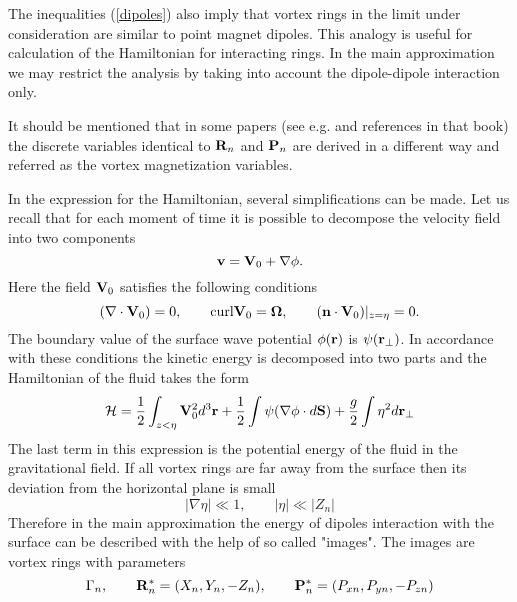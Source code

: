 The inequalities (\ref{dipoles}) also imply that vortex rings in the limit under 
consideration are similar to  point magnet dipoles. 
This analogy is useful for calculation of the Hamiltonian for interacting 
rings. In the main approximation we may restrict the analysis by 
taking into account the dipole-dipole interaction only.

It should be mentioned that in some papers
(see e.g. \cite{Chorin} and references in that book) the discrete variables
identical to ${\bf R}_{n}$ and ${\bf P}_n$ are derived in a different way and 
referred as the vortex magnetization variables. 

In the expression for the Hamiltonian, several simplifications can be made.
Let us recall that for each moment of time it is possible to decompose 
the velocity field into two components
\begin{equation}
{\bf v}={\bf V}_0+\nabla\phi.
\end{equation}
Here the field ${\bf V}_0$ satisfies the following conditions
$$
(\nabla\cdot{\bf V}_0)=0,\qquad \mbox{curl}{\bf V}_0={\bf \Omega},\qquad
({\bf n}\cdot{\bf V}_0)|_{z=\eta}=0.
$$
The boundary value of the surface wave potential $\phi({\bf r})$ is 
$\psi({\bf r}_\bot)$. In accordance with these conditions 
the kinetic energy is decomposed into two parts and the Hamiltonian
of the fluid takes the form
\begin{equation}
{\cal H}=\frac{1}{2}\int_{z<\eta}{\bf V}_0^2d^3{\bf r}+
\frac{1}{2}\int\psi(\nabla\phi\cdot d{\bf S})+
\frac{g}{2}\int\eta^2d{\bf r}_{\bot}
\end{equation}
The last term in this expression is the potential energy 
of the fluid in the gravitational field.
If all vortex rings are far away from the surface then its deviation from 
the horizontal plane is small
\begin{equation}\label{smallangle}
|\nabla\eta|\ll 1,\qquad|\eta|\ll|Z_n|
\end{equation}
Therefore in the main approximation the energy of dipoles interaction with
the surface can be described with the help of so called "images". 
The images are vortex rings with parameters
\begin{equation}
\Gamma_n,\qquad
{\bf R}^*_n=(X_n,Y_n,-Z_n),\qquad {\bf P}^*_n=(P_{xn},P_{yn},-P_{zn})
\end{equation}

